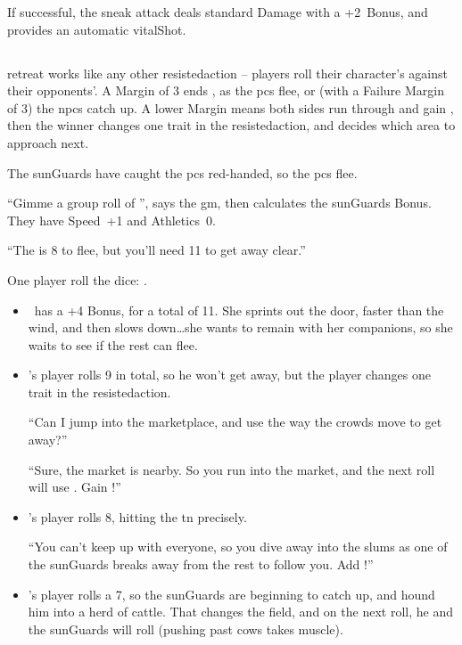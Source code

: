 \begin{multicols}{2}
If successful, the sneak attack deals standard Damage with a +2~Bonus, and provides an automatic \gls{vitalShot}.

\stopcontents[Manoeuvres]

\subsection{}
\label{chases}

\Gls{retreat} works like any other \gls{resistedaction} -- players roll their character's  against their opponents'.
A Margin of 3 ends , as the \glspl{pc} flee, or (with a Failure Margin of 3) the \glspl{npc} catch up.
A lower Margin means both sides run through  and gain , then the winner changes one \gls{trait} in the \gls{resistedaction}, and decides which \gls{area} to approach next.

\begin{exampletext}
  The \glspl{sunGuard} have caught the \glspl{pc} red-handed, so the \glspl{pc} flee.

  {\sffamily ``Gimme a group roll of ''}, says the \gls{gm}, then calculates  the \glspl{sunGuard} Bonus.
  They have Speed~+1 and Athletics~0.

  {\sffamily ``The  is 8 to flee, but you'll need 11 to get away clear.''}

  One player roll the dice: .
  \begin{itemize}
    \item
    \composeHumanName\ has a +4 Bonus, for a total of 11.
    She sprints out the door, faster than the wind, and then slows down\ldots she wants to remain with her companions, so she waits to see if the rest can flee.
    \item
    \composeHumanName's player rolls 9 in total, so he won't get away, but the player changes one \gls{trait} in the \gls{resistedaction}.

  {\textit\sffamily ``Can I jump into the marketplace, and use the way the crowds move to get away?''}

  {\sffamily ``Sure, the market is nearby.
  So you run into the market, and the next roll will use .
  Gain !''}
  \item
  \composeHumanName's player rolls 8, hitting the \gls{tn} precisely.

  {\sffamily ``You can't keep up with everyone, so you dive away into the slums as one of the \glspl{sunGuard} breaks away from the rest to follow you.
  Add !''}
  \item
  \composeHumanName's player rolls a 7, so the \glspl{sunGuard} are beginning to catch up, and hound him into a herd of cattle.
  That changes the field, and on the next roll, he and the \glspl{sunGuard} will roll  (pushing past cows takes muscle).


\end{itemize}
\end{exampletext}
\end{multicols}

